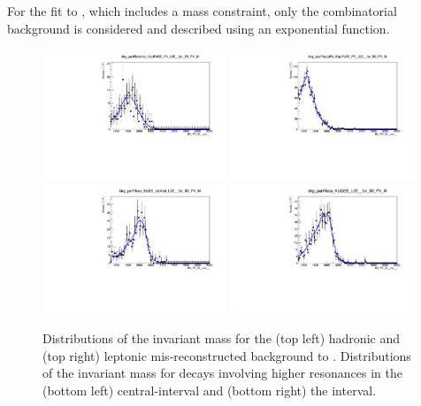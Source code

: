 For the fit to \BdToKstPsiee, which includes a \psitwos mass constraint, only the combinatorial background is considered
and described using an exponential function.
%
\begin{figure}[t!]
\centering
\includegraphics[width=0.49\textwidth]{RKst/figs/Fit/fit_EE/rooKeysModel_bkg_partRecoKst_KstJPsEE_PV_L0E__for_B0_PV_M.pdf}
\includegraphics[width=0.49\textwidth]{RKst/figs/Fit/fit_EE/rooKeysModel_bkg_partRecoJPs_KstJPsEE_PV_L0E__for_B0_PV_M.pdf}
\includegraphics[width=0.49\textwidth]{RKst/figs/Fit/fit_EE/rooKeysModel_bkg_partReco_KstEE_central_L0E__for_B0_PV_M.pdf}
\includegraphics[width=0.49\textwidth]{RKst/figs/Fit/fit_EE/rooKeysModel_bkg_partReco_KstGEE_L0E__for_B0_PV_M.pdf}
\caption{Distributions of the \mKpiee invariant mass for the (top left) hadronic and (top right) leptonic mis-reconstructed background
to \BdToKstJPsee. Distributions of the \mKpiee invariant mass for decays involving
higher \Kstarz resonances in the (bottom left) central-\qsq interval and (bottom right) the \BdToKstGee interval.}
\label{fig:misreco}


\end{figure}

